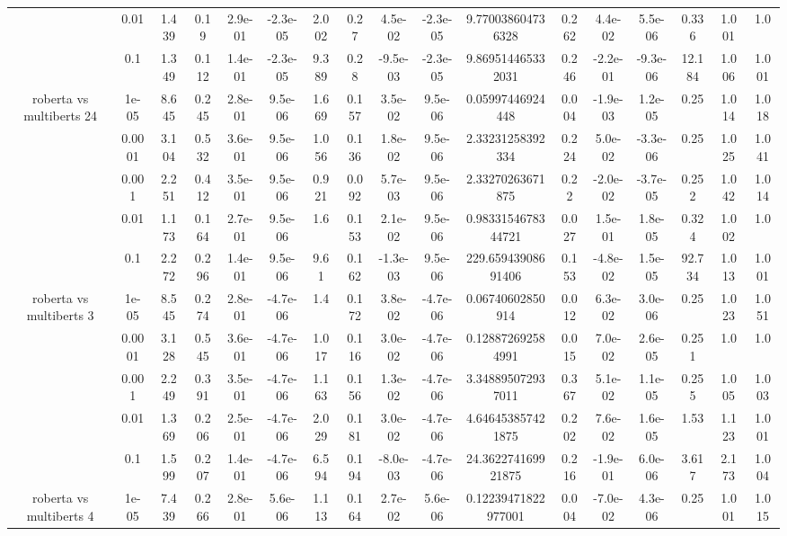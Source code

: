 \begin{tabular}{|c|c|c|c|c|c|c|c|c|c|c|c|c|c|c|c|c|}
 & 0.01 & 1.439 & 0.19 & 2.9e-01 & -2.3e-05 & 2.002 & 0.27 & 4.5e-02 & -2.3e-05 & 9.770038604736328 & 0.262 & 4.4e-02 & 5.5e-06 & 0.336 & 1.001 & 1.0 \\
 & 0.1 & 1.349 & 0.112 & 1.4e-01 & -2.3e-05 & 9.389 & 0.28 & -9.5e-03 & -2.3e-05 & 9.869514465332031 & 0.246 & -2.2e-01 & -9.3e-06 & 12.184 & 1.006 & 1.001 \\
\hline
\multirow{5}{*}{roberta  vs multiberts 24} & 1e-05 & 8.645 & 0.245 & 2.8e-01 & 9.5e-06 & 1.669 & 0.157 & 3.5e-02 & 9.5e-06 & 0.05997446924448 & 0.004 & -1.9e-03 & 1.2e-05 & 0.25 & 1.014 & 1.018 \\
 & 0.0001 & 3.104 & 0.532 & 3.6e-01 & 9.5e-06 & 1.056 & 0.136 & 1.8e-02 & 9.5e-06 & 2.33231258392334 & 0.224 & 5.0e-02 & -3.3e-06 & 0.25 & 1.025 & 1.041 \\
 & 0.001 & 2.251 & 0.412 & 3.5e-01 & 9.5e-06 & 0.921 & 0.092 & 5.7e-03 & 9.5e-06 & 2.33270263671875 & 0.22 & -2.0e-02 & -3.7e-05 & 0.252 & 1.042 & 1.014 \\
 & 0.01 & 1.173 & 0.164 & 2.7e-01 & 9.5e-06 & 1.6 & 0.153 & 2.1e-02 & 9.5e-06 & 0.9833154678344721 & 0.027 & 1.5e-01 & 1.8e-05 & 0.324 & 1.002 & 1.0 \\
 & 0.1 & 2.272 & 0.296 & 1.4e-01 & 9.5e-06 & 9.61 & 0.162 & -1.3e-03 & 9.5e-06 & 229.65943908691406 & 0.153 & -4.8e-02 & 1.5e-05 & 92.734 & 1.013 & 1.001 \\
\hline
\multirow{5}{*}{roberta  vs multiberts 3} & 1e-05 & 8.545 & 0.274 & 2.8e-01 & -4.7e-06 & 1.4 & 0.172 & 3.8e-02 & -4.7e-06 & 0.06740602850914 & 0.012 & 6.3e-02 & 3.0e-06 & 0.25 & 1.023 & 1.051 \\
 & 0.0001 & 3.128 & 0.545 & 3.6e-01 & -4.7e-06 & 1.017 & 0.116 & 3.0e-02 & -4.7e-06 & 0.128872692584991 & 0.015 & 7.0e-02 & 2.6e-05 & 0.251 & 1.0 & 1.0 \\
 & 0.001 & 2.249 & 0.391 & 3.5e-01 & -4.7e-06 & 1.163 & 0.156 & 1.3e-02 & -4.7e-06 & 3.348895072937011 & 0.367 & 5.1e-02 & 1.1e-05 & 0.255 & 1.005 & 1.003 \\
 & 0.01 & 1.369 & 0.206 & 2.5e-01 & -4.7e-06 & 2.029 & 0.181 & 3.0e-02 & -4.7e-06 & 4.646453857421875 & 0.202 & 7.6e-02 & 1.6e-05 & 1.53 & 1.123 & 1.001 \\
 & 0.1 & 1.599 & 0.207 & 1.4e-01 & -4.7e-06 & 6.594 & 0.194 & -8.0e-03 & -4.7e-06 & 24.362274169921875 & 0.216 & -1.9e-01 & 6.0e-06 & 3.617 & 2.173 & 1.004 \\
\hline
\multirow{5}{*}{roberta  vs multiberts 4} & 1e-05 & 7.439 & 0.266 & 2.8e-01 & 5.6e-06 & 1.113 & 0.164 & 2.7e-02 & 5.6e-06 & 0.12239471822977001 & 0.004 & -7.0e-02 & 4.3e-06 & 0.25 & 1.001 & 1.015 \\

\end{tabular}
